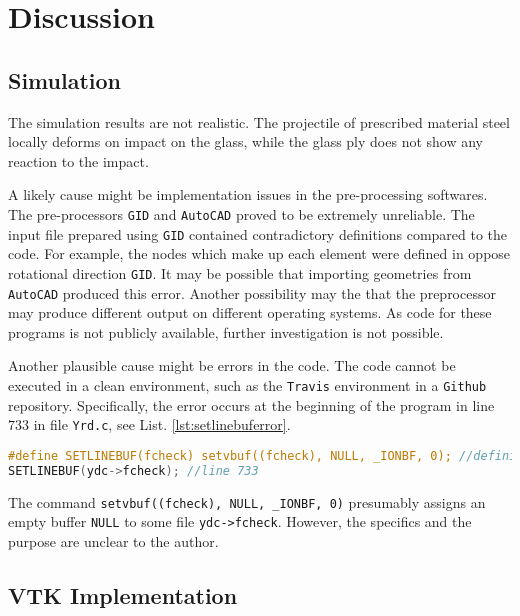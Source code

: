 \section{Discussion}

\subsection{Simulation}

The simulation results are not realistic. The projectile of prescribed material steel locally deforms on impact on the glass, while the glass ply does not show any reaction to the impact.

\bigbreak
A likely cause might be implementation issues in the pre-processing softwares. The pre-processors \texttt{GID} and \texttt{AutoCAD} proved to be extremely unreliable. The input file prepared using \texttt{GID} contained contradictory definitions compared to the code. For example, the nodes which make up each element were defined in oppose rotational direction \texttt{GID}. It may be possible that importing geometries from \texttt{AutoCAD} produced this error. Another possibility may the that the preprocessor may produce different output on different operating systems. As code for these programs is not publicly available, further investigation is not possible.  

\bigbreak
Another plausible cause might be errors in the code. The code cannot be executed in a clean environment, such as the \texttt{Travis} environment in a \texttt{Github} repository. Specifically, the error occurs at the beginning of the program in line $733$ in file \lstinline{Yrd.c}, see List. \ref{lst:setlinebuferror}.

\begin{lstlisting}[language=C, caption=\lstinline{SETLINEBUF} Error in file \lstinline{Yrd.c},label=lst:setlinebuferror]
#define SETLINEBUF(fcheck) setvbuf((fcheck), NULL, _IONBF, 0); //definition
SETLINEBUF(ydc->fcheck); //line 733
\end{lstlisting}

The command \lstinline{setvbuf((fcheck), NULL, _IONBF, 0)} presumably assigns an empty buffer \lstinline{NULL} to some file \lstinline{ydc->fcheck}. However, the specifics and the purpose are unclear to the author.

\subsection{VTK Implementation}

